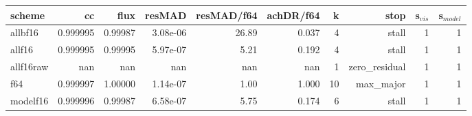 \begin{tabular}{lrrrrrrrrr}
\toprule
scheme & cc & flux & resMAD & resMAD/f64 & achDR/f64 & k & stop & s$_{vis}$ & s$_{model}$ \\
\midrule
allbf16 & 0.999995 & 0.99987 & 3.08e-06 & 26.89 & 0.037 & 4 & stall & 1 & 1 \\
allf16 & 0.999995 & 0.99995 & 5.97e-07 & 5.21 & 0.192 & 4 & stall & 1 & 1 \\
allf16raw & nan & nan & nan & nan & nan & 1 & zero\_residual & 1 & 1 \\
f64 & 0.999997 & 1.00000 & 1.14e-07 & 1.00 & 1.000 & 10 & max\_major & 1 & 1 \\
modelf16 & 0.999996 & 0.99987 & 6.58e-07 & 5.75 & 0.174 & 6 & stall & 1 & 1 \\
\bottomrule
\end{tabular}